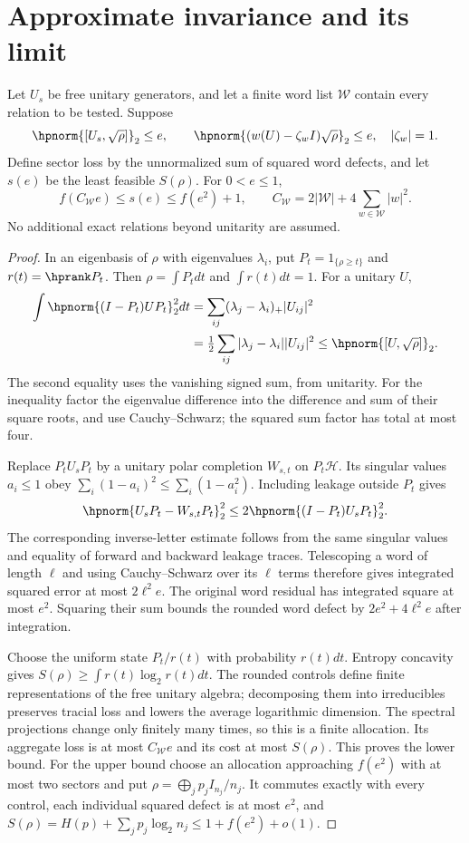 \section{Approximate invariance and its limit}\label{hp:app:rounding}
\begin{proposition}\label{hp:prop:rounding}
Let $U_s$ be free unitary generators, and let a finite word list $\mathcal W$ contain every relation to be tested. Suppose
\[
 \hpnorm{[U_s,\sqrt\rho]}_2\le e,\qquad
 \hpnorm{(w(U)-\zeta_wI)\sqrt\rho}_2\le e,\quad |\zeta_w|=1.
\]
Define sector loss by the unnormalized sum of squared word defects, and let $s(e)$ be the least feasible $S(\rho)$. For $0<e\le1$,
\[
 f(C_{\mathcal W}e)\le s(e)\le f(e^2)+1,\qquad
 C_{\mathcal W}=2|\mathcal W|+4\sum_{w\in\mathcal W}|w|^2.
\]
No additional exact relations beyond unitarity are assumed.
\end{proposition}
\begin{proof}
In an eigenbasis of $\rho$ with eigenvalues $\lambda_i$, put $P_t=1_{\{\rho\ge t\}}$ and $r(t)=\hprank P_t$. Then $\rho=\int P_tdt$ and $\int r(t)dt=1$. For a unitary $U$,
\begin{align*}
 \int\hpnorm{(I-P_t)UP_t}_2^2dt
 &=\sum_{ij}(\lambda_j-\lambda_i)_+|U_{ij}|^2\\
 &=\tfrac12\sum_{ij}|\lambda_j-\lambda_i||U_{ij}|^2
 \le\hpnorm{[U,\sqrt\rho]}_2.
\end{align*}
The second equality uses the vanishing signed sum, from unitarity. For the inequality factor the eigenvalue difference into the difference and sum of their square roots, and use Cauchy--Schwarz; the squared sum factor has total at most four.

Replace $P_tU_sP_t$ by a unitary polar completion $W_{s,t}$ on $P_t\mathcal H$. Its singular values $a_i\le1$ obey $\sum_i(1-a_i)^2\le\sum_i(1-a_i^2)$. Including leakage outside $P_t$ gives
\[
 \hpnorm{U_sP_t-W_{s,t}P_t}_2^2\le2\hpnorm{(I-P_t)U_sP_t}_2^2.
\]
The corresponding inverse-letter estimate follows from the same singular values and equality of forward and backward leakage traces. Telescoping a word of length $\ell$ and using Cauchy--Schwarz over its $\ell$ terms therefore gives integrated squared error at most $2\ell^2e$. The original word residual has integrated square at most $e^2$. Squaring their sum bounds the rounded word defect by $2e^2+4\ell^2e$ after integration.

Choose the uniform state $P_t/r(t)$ with probability $r(t)dt$. Entropy concavity gives $S(\rho)\ge\int r(t)\log_2r(t)dt$. The rounded controls define finite representations of the free unitary algebra; decomposing them into irreducibles preserves tracial loss and lowers the average logarithmic dimension. The spectral projections change only finitely many times, so this is a finite allocation. Its aggregate loss is at most $C_{\mathcal W}e$ and its cost at most $S(\rho)$. This proves the lower bound. For the upper bound choose an allocation approaching $f(e^2)$ with at most two sectors and put $\rho=\bigoplus_jp_jI_{n_j}/n_j$. It commutes exactly with every control, each individual squared defect is at most $e^2$, and $S(\rho)=H(p)+\sum_jp_j\log_2n_j\le1+f(e^2)+o(1)$.
\end{proof}

